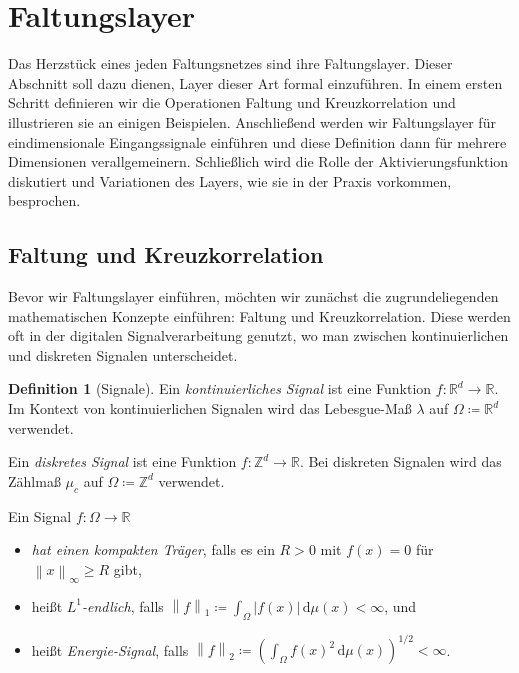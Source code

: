 \documentclass[paper=a4, 	%
		fontsize=11pt,
		abstract=true, 	%
		headsepline, 	%
		notitlepage	%
		]{scrartcl}
\theoremstyle{definition}
\newtheorem{definition}[theorem]{Definition}
\newcommand{\R}{\mathbb{R}}
\newcommand{\Z}{\mathbb{Z}}
\newcommand{\diff}{\,\textrm{d}}
\newcommand{\norm}[1]{\left\lVert#1\right\rVert}
\newcommand{\abs}[1]{\left\lvert#1\right\rvert}
\begin{document}
\section{Faltungslayer}

Das Herzstück eines jeden Faltungsnetzes sind ihre Faltungslayer.
Dieser Abschnitt soll dazu dienen, Layer dieser Art formal einzuführen.
In einem ersten Schritt definieren wir die Operationen Faltung und Kreuzkorrelation und illustrieren sie an einigen Beispielen.
Anschließend werden wir Faltungslayer für eindimensionale Eingangssignale einführen und diese Definition dann für mehrere Dimensionen verallgemeinern.
Schließlich wird die Rolle der Aktivierungsfunktion diskutiert und Variationen des Layers, wie sie in der Praxis vorkommen, besprochen.



\subsection{Faltung und Kreuzkorrelation}\label{subsec:convolution}

Bevor wir Faltungslayer einführen, möchten wir zunächst die zugrundeliegenden mathematischen Konzepte einführen:
Faltung und Kreuzkorrelation.
Diese werden oft in der digitalen Signalverarbeitung genutzt, wo man zwischen kontinuierlichen und diskreten Signalen unterscheidet.

\newcommand{\llambda}{\lambda}
\newcommand{\cmeasure}{\mu_c}

\begin{definition}[Signale]
    Ein \emph{kontinuierliches Signal} ist eine Funktion $f: \R^d\rightarrow \R$.
    Im Kontext von kontinuierlichen Signalen wird das Lebesgue-Maß $\llambda$ auf $\Omega\coloneqq \R^d$ verwendet.

    \noindent Ein \emph{diskretes Signal} ist eine Funktion $f: \Z^d \rightarrow \R$.
    Bei diskreten Signalen wird das Zählmaß $\cmeasure$ auf $\Omega\coloneqq \Z^d$ verwendet.

    \noindent Ein Signal $f: \Omega \rightarrow \R$
    \begin{itemize}
        \item \emph{hat einen kompakten Träger}, falls es ein $R > 0$ mit $f(x) = 0$ für $\norm{x}_\infty \geq R$ gibt,
        \item heißt \emph{$L^1$-endlich}, falls $\norm{f}_1 \coloneqq \int_{\Omega} \abs{f(x)} \diff \mu(x) < \infty$, und
        \item heißt \emph{Energie-Signal}, falls $\norm{f}_2 \coloneqq \left(\int_{\Omega} f(x)^2 \diff \mu(x) \right)^{1/2} < \infty$.
    \end{itemize}
\end{definition}
\end{document}
